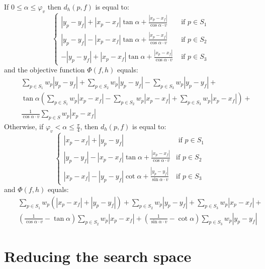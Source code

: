 \documentclass[11pt,a4paper,oneside,onecolumn]{article}
\newcommand{\x}[1]{x_{#1}}
\newcommand{\y}[1]{y_{#1}}
\begin{document}
If $0\leq\alpha\leq\varphi_v$ then $d_h(p,f)$ is equal to:
\begin{equation*}
\left\{
\begin{array}{rr}
  |\y{p}-\y{f}|+|\x{p}-\x{f}|\tan\alpha+
  \frac{|\x{p}-\x{f}|}{\cos\alpha\cdot v} & \text{ if }p\in S_1\\
  |\y{p}-\y{f}|-|\x{p}-\x{f}|\tan\alpha+
  \frac{|\x{p}-\x{f}|}{\cos\alpha\cdot v} & \text{ if }p\in S_2\\
  -|\y{p}-\y{f}|+|\x{p}-\x{f}|\tan\alpha+
  \frac{|\x{p}-\x{f}|}{\cos\alpha\cdot v} & \text{ if }p\in S_3
\end{array}
\right.
\end{equation*}
and the objective function $\Phi(f,h)$ equals:
\begin{eqnarray}
\nonumber 
&&\sum_{p\in S_1}w_p|\y{p}-\y{f}|+\sum_{p\in S_2}w_p|\y{p}-\y{f}|-\sum_{p\in S_3}w_p|\y{p}-\y{f}|+\\
\nonumber
& &
\tan\alpha\left(\sum_{p\in S_1}w_p|\x{p}-\x{f}|-\sum_{p\in
S_2}w_p|\x{p}-\x{f}|+\sum_{p\in S_3}w_p|\x{p}-\x{f}|\right)+\\
&&\frac{1}{\cos\alpha\cdot v}\sum_{p\in S}w_p|\x{p}-\x{f}|\label{eq7}
\end{eqnarray}
Otherwise, if $\varphi_v<\alpha\leq\frac{\pi}{4}$, then
$d_h(p,f)$ is equal to:
\begin{equation*}
\left\{
\begin{array}{cr}
  |\x{p}-\x{f}|+|\y{p}-\y{f}| & \text{ if }p\in S_1\\
  |\y{p}-\y{f}|-|\x{p}-\x{f}|\tan\alpha+\frac{|\x{p}-\x{f}|}{\cos\alpha\cdot v} & \text{
if }p\in S_2\\
  |\x{p}-\x{f}|-|\y{p}-\y{f}|\cot\alpha+\frac{|\y{p}-\y{f}|}{\sin\alpha\cdot v} & \text{
if }p\in S_3
\end{array}
\right.
\end{equation*}
and $\Phi(f,h)$ equals:
\begin{eqnarray}
\nonumber
&&\sum_{p\in
S_1}w_p\left(|\x{p}-\x{f}|+|\y{p}-\y{f}|\right)+\sum_{p\in
S_2}w_p|\y{p}-\y{f}|+\sum_{p\in S_3}w_p|\x{p}-\x{f}|+\\
&&\left(\frac{1}{\cos\alpha\cdot v}-\tan\alpha\right)\sum_{p\in S_2}w_p|\x{p}-\x{f}|+
\left(\frac{1}{\sin\alpha\cdot
v}-\cot\alpha\right)\sum_{p\in S_3}w_p|\y{p}-\y{f}|\label{eq6}
\end{eqnarray}

\section{Reducing the search space}\label{section:discretization}
\end{document}
